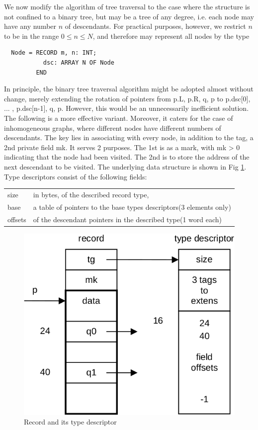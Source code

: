 We now modify the algorithm of tree traversal to the case where the structure is not confined
to a binary tree, but may be a tree of any degree, i.e. each node may have any number $n$ of
descendants. For practical purposes, however, we restrict $n$ to be in the range $0 \leq n
\leq N$, and therefore may represent all nodes by the type
\begin{verbatim}
  Node = RECORD m, n: INT;
           dsc: ARRAY N OF Node
         END
\end{verbatim}
In principle, the binary tree traversal algorithm might be adopted almost without change,
merely extending the rotation of pointers from p.L, p.R, q, p to p.dsc[0], ... , p.dsc[n-1], q, p. However, this
would be an unnecessarily inefficient solution. The following is a more effective variant. Moreover, it
caters for the case of inhomogeneous graphs, where different nodes have different numbers of
descendants. The key lies in associating with every node, in addition to the tag, a 2nd private
field mk. It serves 2 purposes. The 1st is as a mark, with mk > 0 indicating that the node had
been visited. The 2nd is to store the address of the next descendant to be visited. The
underlying data structure is shown in Fig \ref{fig:record}. Type descriptors consist of the following fields:
\begin{table}[h!]
  \centering
  \setlength{\tabcolsep}{2pt}
  \begin{tabular}{l l}
    size & {\small in bytes, of the described record type,} \\
    base & {\small a table of pointers to the base types descriptors(3 elements only)} \\
    {\small offsets} & {\small of the descendant pointers in the described type(1 word each)}
  \end{tabular}
\end{table}
\begin{figure}[h!]
  \label{fig:record}
  \centering
  \includegraphics[width=.9\textwidth]{i/x}
  \caption{Record and its type descriptor}
\end{figure}

